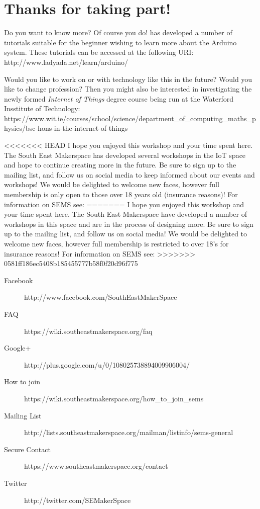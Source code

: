 \newpage
\chapter*{Thanks for taking part!}

Do you want to know more? Of course you do! \citet{fried-12} has developed a number of tutorials suitable for the beginner wishing to learn more about the \gls{Arduino} system. These tutorials can be accessed at the following URI: http://www.ladyada.net/learn/arduino/

Would you like to work on or with technology like this in the future? Would you like to change profession? Then you might also be interested in investigating the newly formed \textit{Internet of Things} degree course being run at the Waterford Insstitute of Technology: https://www.wit.ie/courses/school/science/department\_of\_computing\_maths\_physics/bsc-hons-in-the-internet-of-things

<<<<<<< HEAD
I hope you enjoyed this workshop and your time spent here. The South East Makerspace has developed several workshops in the IoT space and hope to continue creating more in the future. Be sure to sign up to the mailing list, and follow us on social media to keep informed about our events and workshops! We would be delighted to welcome new faces, however full membership is only open to those over 18 years old (insurance reasons)! For information on SEMS see:
=======
I hope you enjoyed this workshop and your time spent here. The South East Makerspace have developed a number of workshops in this space and are in the process of designing more. Be sure to sign up to the mailing list, and follow us on social media!  We would be delighted to welcome new faces, however full membership is restricted to over 18's for insurance reasons! For information on SEMS see:
>>>>>>> 0581ff186ec5408b185455777b58f0f20d96f775

\begin{description}
	\item[Facebook] http://www.facebook.com/SouthEastMakerSpace
	\item[FAQ] https://wiki.southeastmakerspace.org/faq
	\item[Google+] http://plus.google.com/u/0/108025738894009906004/
	\item[How to join] https://wiki.southeastmakerspace.org/how\_to\_join\_sems
	\item[Mailing List] http://lists.southeastmakerspace.org/mailman/listinfo/sems-general
	\item[Secure Contact] https://www.southeastmakerspace.org/contact
	\item[Twitter] http://twitter.com/SEMakerSpace
\end{description} 





